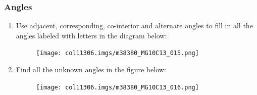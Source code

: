 \begin{table}[H]
{\begin{mdframed}[linewidth=4, leftmargin=40, rightmargin=40]
\begin{exercise}
    \end{exercise}
    \end{mdframed}
    }
    \noindent
\vspace{-1cm}
  \label{m38380*secfhsst!!!underscore!!!id550}
        \subsubsection{ Angles }
        \nopagebreak
        \label{m38380*eip-407}\begin{enumerate}[noitemsep, label=\textbf{\arabic*}. ] 
            \item Use adjacent, corresponding, co-interior and alternate angles to fill in all the angles labeled with letters in the diagram below:

    \setcounter{subfigure}{0}


	\begin{figure}[H] %
    \begin{center}
    \label{m38380*id317272!!!underscore!!!media}\label{m38380*id317272!!!underscore!!!printimage}\texttt{[image: col11306.imgs/m38380\_MG10C13\_015.png]} %
        
      \vspace{2pt}
    \vspace{.1in}
    
    \end{center}

 \end{figure}   

    \addtocounter{footnote}{-0}
            \item Find all the unknown angles in the figure below:

    \setcounter{subfigure}{0}


	\begin{figure}[H] %
    \begin{center}
    \label{m38380*id317298!!!underscore!!!media}\label{m38380*id317298!!!underscore!!!printimage}\texttt{[image: col11306.imgs/m38380\_MG10C13\_016.png]} %
        
      \vspace{2pt}
    \vspace{.1in}
    
    \end{center}

 \end{figure}   


\end{enumerate}
\end{table}
